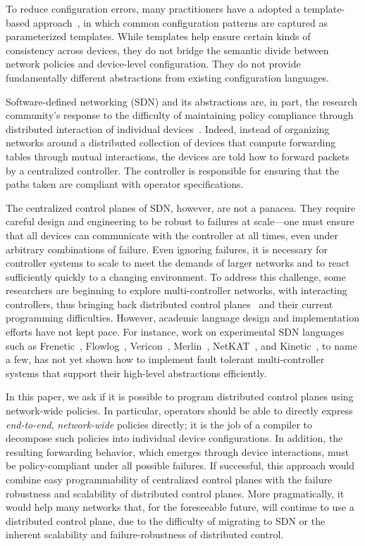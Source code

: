 To reduce configuration errors, many practitioners have a adopted a template-based
approach~\cite{hatch,thwack}, in which common configuration patterns are captured as parameterized templates.
 While templates help ensure certain kinds of consistency across devices, they do not
bridge the
semantic divide between network policies and device-level configuration.
They do not provide fundamentally different abstractions
from existing configuration languages.

Software-defined networking (SDN) and its abstractions 
are, in part, the research
community's response to the difficulty of maintaining policy
compliance through distributed interaction of individual
devices~\cite{sdn-languages}. Indeed, instead of organizing networks
around a distributed collection of devices that compute forwarding tables through
mutual interactions, the devices are told how to
forward packets by a centralized controller. The controller is responsible for ensuring that the
paths taken are compliant with operator specifications.

The centralized control planes of SDN, however, are not a panacea.
%
They require careful design and engineering to be robust to failures at scale---one must ensure that all devices can communicate with the controller at all times, even under arbitrary combinations of failure. Even ignoring failures, it is necessary for controller systems to
scale to meet the demands of larger networks and to react sufficiently quickly
to a changing environment. To address this challenge, some researchers are beginning to 
explore
multi-controller networks, with interacting controllers, thus bringing back distributed
control planes~\cite{mccauley2013extending,onos} and their current programming difficulties.  However, academic
language design and implementation efforts have not kept pace.  For instance, work on
experimental SDN languages
such as Frenetic~\cite{frenetic}, Flowlog~\cite{flowlog}, Vericon~\cite{vericon}, Merlin~\cite{merlin}, NetKAT~\cite{netkat}, and Kinetic~\cite{kinetic}, to
name a few, has not yet shown how to implement fault tolerant
multi-controller systems that support their high-level abstractions efficiently.

In this paper, we ask if it is possible to program 
distributed control planes using network-wide policies.  In particular,
operators should be able to directly express \emph{end-to-end}, 
\emph{network-wide} policies directly; it is the job of a compiler
to decompose such policies into individual device configurations. 
In addition, the resulting forwarding behavior, which emerges through device interactions, must be policy-compliant under all possible failures.
If successful, this approach would combine easy programmability of centralized control planes with the failure robustness and scalability of distributed control planes.
%
More pragmatically, it would help many networks that, for the foreseeable future, will continue to use a distributed control plane, due to the difficulty of migrating to SDN or the inherent scalability and failure-robustness of distributed control.

